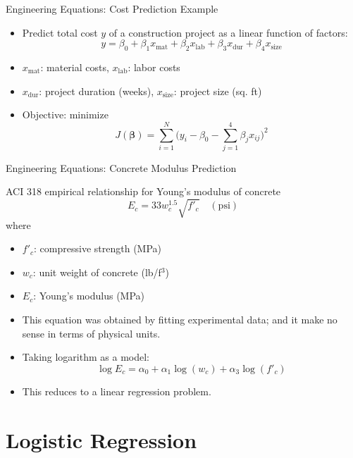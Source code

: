 \documentclass[german,10pt]{beamer}
\begin{document}
\begin{frame}{Engineering Equations: Cost Prediction Example}
  \begin{itemize}
    \item Predict total cost $y$ of a construction project as a linear function of factors:
    \[
      y = \beta_0 + \beta_1 x_{\text{mat}} + \beta_2 x_{\text{lab}} + \beta_3 x_{\text{dur}} + \beta_4 x_{\text{size}}
    \]
    \item $x_{\text{mat}}$: material costs, \quad
          $x_{\text{lab}}$: labor costs
    \item $x_{\text{dur}}$: project duration (weeks), \quad
          $x_{\text{size}}$: project size (sq. ft)
    \item Objective: minimize
    \[
      J(\boldsymbol{\beta}) = \sum_{i=1}^N \bigl(y_i - \beta_0 - \sum_{j=1}^4 \beta_j x_{ij}\bigr)^2
    \]
  \end{itemize}
\end{frame}

\begin{frame}{Engineering Equations: Concrete Modulus Prediction}
\begin{block}{ACI 318 empirical relationship for Young's modulus of concrete}
    \[
      E_c = 33 w_c^{1.5} \sqrt{f'_c} \quad (\mathrm{psi})
    \]
    where
  \begin{itemize}
    \item $f'_c$: compressive strength (MPa)
    \item $w_c$: unit weight of concrete (lb/f$^3$)
    \item $E_c$: Young's modulus (MPa)
  \end{itemize}
  \end{block}
    \begin{itemize}
    \item This equation was obtained by fitting experimental data; and it make no sense in terms of physical units. 
    \item Taking logarithm as a model:
    \[
\log{E_c} = \alpha_0 + \alpha_1 \log(w_c) + \alpha_3 \log(f'_c)
    \]
\item This reduces to a linear regression problem. 

  \end{itemize}

\end{frame}

\section{Logistic Regression}
\end{document}
